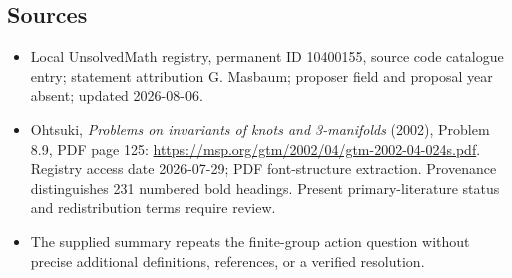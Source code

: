 \documentclass[11pt]{article}
\begin{document}
\subsection{Sources}
\begin{itemize}
\item Local UnsolvedMath registry, permanent ID 10400155, source code catalogue entry; statement attribution G. Masbaum; proposer field and proposal year absent; updated 2026-08-06.
\item Ohtsuki, \emph{Problems on invariants of knots and 3-manifolds} (2002), Problem 8.9, PDF page 125: \url{https://msp.org/gtm/2002/04/gtm-2002-04-024s.pdf}. Registry access date 2026-07-29; PDF font-structure extraction. Provenance distinguishes 231 numbered bold headings. Present primary-literature status and redistribution terms require review.
\item The supplied summary repeats the finite-group action question without precise additional definitions, references, or a verified resolution.
\end{itemize}
\end{document}
